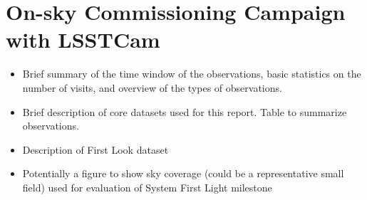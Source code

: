 \section{On-sky Commissioning Campaign with LSSTCam}
\label{sec:campaign}

\begin{itemize}
    \item Brief summary of the time window of the observations, basic statistics on the number of visits, and overview of the types of observations.
    \item Brief description of core datasets used for this report. Table to summarize observations.
    \item Description of First Look dataset
    \item Potentially a figure to show sky coverage (could be a representative small field) used for evaluation of System First Light milestone
\end{itemize}